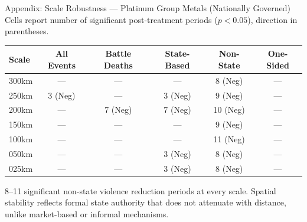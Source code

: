 \documentclass[aspectratio=169,11pt]{beamer}
\begin{document}
\begin{frame}{Appendix: Scale Robustness --- Platinum Group Metals {\normalsize\color{muted}(Nationally Governed)}}
{\footnotesize Cells report number of significant post-treatment periods ($p<0.05$), direction in parentheses.}

\vspace{0.3em}
{\footnotesize
\begin{tabular}{lccccc}
\toprule
\textcolor{muted}{\textbf{Scale}} & \textcolor{muted}{\textbf{All Events}} & \textcolor{muted}{\textbf{Battle Deaths}} & \textcolor{muted}{\textbf{State-Based}} & \textcolor{muted}{\textbf{Non-State}} & \textcolor{muted}{\textbf{One-Sided}} \\
\midrule
300km & ---     & ---     & ---     & 8 (Neg)  & --- \\
250km & 3 (Neg) & ---     & 3 (Neg) & 9 (Neg)  & --- \\
200km & ---     & 7 (Neg) & 7 (Neg) & 10 (Neg) & --- \\
150km & ---     & ---     & ---     & 9 (Neg)  & --- \\
100km & ---     & ---     & ---     & 11 (Neg) & --- \\
050km & ---     & ---     & 3 (Neg) & 8 (Neg)  & --- \\
025km & ---     & ---     & 3 (Neg) & 8 (Neg)  & --- \\
\bottomrule
\end{tabular}
}

\vspace{0.4em}
{\small\color{muted} 8--11 significant non-state violence reduction periods at every scale. Spatial stability reflects formal state authority that does not attenuate with distance, unlike market-based or informal mechanisms.}
\end{frame}
\end{document}
